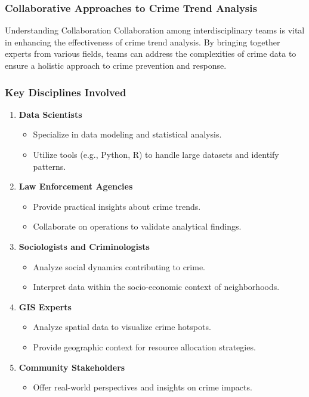 \documentclass[aspectratio=169]{beamer}
\begin{document}
\begin{frame}[fragile]
    \frametitle{Collaborative Approaches to Crime Trend Analysis}
    \begin{block}{Understanding Collaboration}
        Collaboration among interdisciplinary teams is vital in enhancing the effectiveness of crime trend analysis. By bringing together experts from various fields, teams can address the complexities of crime data to ensure a holistic approach to crime prevention and response.
    \end{block}
\end{frame}

\begin{frame}[fragile]
    \frametitle{Key Disciplines Involved}
    \begin{enumerate}
        \item \textbf{Data Scientists}
        \begin{itemize}
            \item Specialize in data modeling and statistical analysis.
            \item Utilize tools (e.g., Python, R) to handle large datasets and identify patterns.
        \end{itemize}
        
        \item \textbf{Law Enforcement Agencies}
        \begin{itemize}
            \item Provide practical insights about crime trends.
            \item Collaborate on operations to validate analytical findings.
        \end{itemize}
        
        \item \textbf{Sociologists and Criminologists}
        \begin{itemize}
            \item Analyze social dynamics contributing to crime.
            \item Interpret data within the socio-economic context of neighborhoods.
        \end{itemize}
        
        \item \textbf{GIS Experts}
        \begin{itemize}
            \item Analyze spatial data to visualize crime hotspots.
            \item Provide geographic context for resource allocation strategies.
        \end{itemize}

        \item \textbf{Community Stakeholders}
        \begin{itemize}
            \item Offer real-world perspectives and insights on crime impacts.
        \end{itemize}
    \end{enumerate}
\end{frame}
\end{document}
